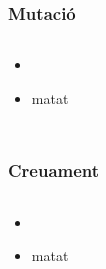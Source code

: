 \documentclass{beamer}
\begin{document}
\begin{frame}
	\frametitle{Mutació}
	\begin{columns}[c]
		\begin{itemize}
			\item 
				\pause
			\item matat
		\end{itemize}
	\end{columns}
\end{frame}

\begin{frame}
	\frametitle{Creuament }
	\begin{columns}[c]
		\begin{itemize}
			\item 
				\pause
			\item matat
		\end{itemize}
	\end{columns}
\end{frame}
\end{document}
